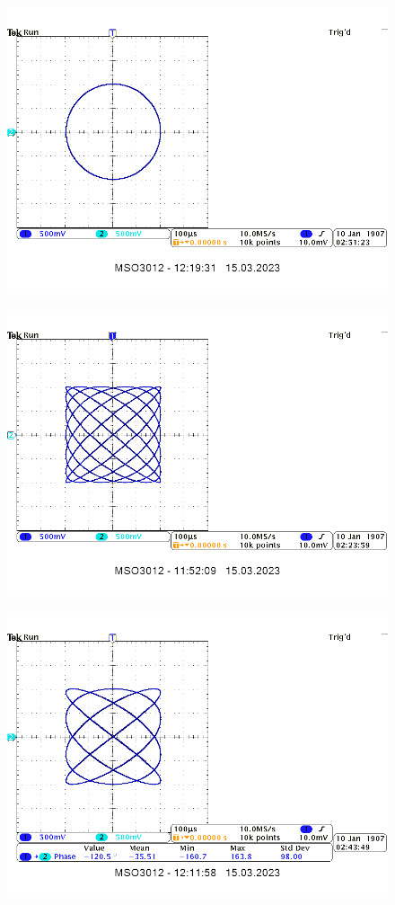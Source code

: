 \documentclass[14pt, table]{extarticle}
\begin{document}
\begin{figure}[H]
\includegraphics[scale=0.7]{A9}
\centering
\end{figure}

\begin{figure}[H]
\includegraphics[scale=0.7]{A5}
\centering
\end{figure}

\begin{figure}[H]
\includegraphics[scale=0.7]{A6}
\centering
\end{figure}
\end{document}
